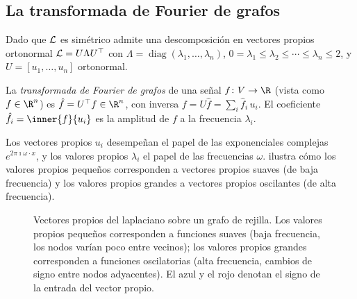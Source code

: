 \subsection{La transformada de Fourier de grafos}
\label{sec:graphs:gft}

Dado que $\mathcal{L}$ es sim\'etrico admite una descomposici\'on en vectores propios
ortonormal $\mathcal{L} = U \Lambda U^\top$ con $\Lambda = \operatorname{diag}(\lambda_1,
\dots, \lambda_n)$, $0 = \lambda_1 \le \lambda_2 \le \cdots \le \lambda_n \le 2$, y
$U = [u_1, \dots, u_n]$ ortonormal.

\begin{definition}
\label{def:graphs:gft}
La \emph{transformada de Fourier de grafos} de una se\~nal $f \colon V \to \R$
(vista como $f \in \R^n$) es $\hat f = U^\top f \in \R^n$, con inversa
$f = U \hat f = \sum_i \hat f_i\, u_i$. El coeficiente
$\hat f_i = \inner{f}{u_i}$ es la amplitud de $f$ a la frecuencia $\lambda_i$.
\end{definition}

Los vectores propios $u_i$ desempe\~nan el papel de las exponenciales complejas
$e^{2\pi \imath \omega \cdot x}$, y los valores propios $\lambda_i$ el papel de
las frecuencias $\omega$.  ilustra c\'omo los
valores propios peque\~nos corresponden a vectores propios suaves (de baja
frecuencia) y los valores propios grandes a vectores propios oscilantes (de alta
frecuencia).

\begin{figure}[h]
\centering
{}
\caption[Vectores propios del laplaciano]{Vectores propios del laplaciano sobre un
grafo de rejilla. Los valores propios peque\~nos corresponden a funciones suaves
(baja frecuencia, los nodos var\'ian poco entre vecinos); los valores propios
grandes corresponden a funciones oscilatorias (alta frecuencia, cambios de signo
entre nodos adyacentes). El azul y el rojo denotan el signo de la entrada del
vector propio.}
\label{fig:graphs:eigenvectors}
\end{figure}

